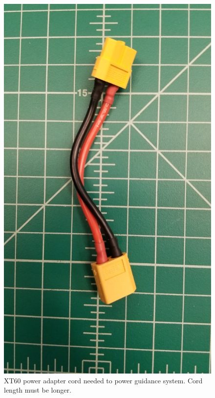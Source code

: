 \begin{figure}
\begin{center}
\includegraphics[width=0.8\columnwidth]{figures/hovering5.png}
\end{center}
\caption{XT60 power adapter cord needed to power guidance system. Cord length must be longer.}
\label{fig:hovering5}
\end{figure}
